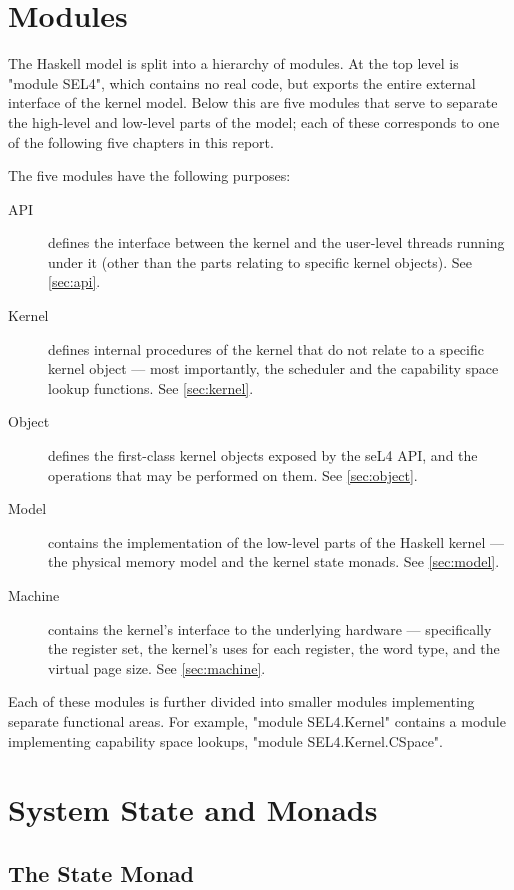 \section{Modules}\label{sec:haskell.modules}

The Haskell model is split into a hierarchy of modules. At the top level is "module SEL4", which contains no real code, but exports the entire external interface of the kernel model. Below this are five modules that serve to separate the high-level and low-level parts of the model; each of these corresponds to one of the following five chapters in this report.

The five modules have the following purposes:
\begin{description}
\item[API] defines the interface between the kernel and the user-level threads running under it (other than the parts relating to specific kernel objects). See \autoref{sec:api}.
\item[Kernel] defines internal procedures of the kernel that do not relate to a specific kernel object --- most importantly, the scheduler and the capability space lookup functions. See \autoref{sec:kernel}.
\item[Object] defines the first-class kernel objects exposed by the seL4 API, and the operations that may be performed on them. See \autoref{sec:object}.
\item[Model] contains the implementation of the low-level parts of the Haskell kernel --- the physical memory model and the kernel state monads. See \autoref{sec:model}.
\item[Machine] contains the kernel's interface to the underlying hardware --- specifically the register set, the kernel's uses for each register, the word type, and the virtual page size. See \autoref{sec:machine}.
\end{description}

Each of these modules is further divided into smaller modules implementing separate functional areas. For example, "module SEL4.Kernel" contains a module implementing capability space lookups, "module SEL4.Kernel.CSpace".

\section{System State and Monads}\label{sec:haskell.state-monads}

\subsection{The State Monad}

